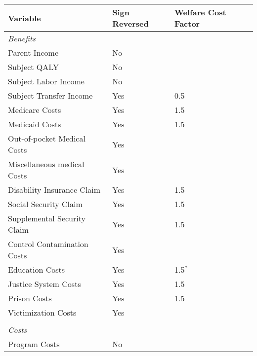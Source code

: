 \begin{tabular}{l l p{2cm}}
\hline\hline			
Variable & Sign Reversed	& Welfare Cost Factor \\
\hline
\emph{Benefits} 	\\			
Parent Income			& No \\
Subject QALY			& No \\
Subject Labor Income	& No \\
Subject Transfer Income	& Yes	& 0.5 \\
Medicare Costs			& Yes	& 1.5 \\
Medicaid Costs			& Yes	& 1.5 \\
Out-of-pocket Medical Costs	& Yes \\
Miscellaneous medical Costs	& Yes \\
Disability Insurance Claim	& Yes	&	1.5 \\
Social Security Claim	& Yes	&	1.5 \\
Supplemental Security Claim	& Yes	&	1.5 \\
Control Contamination Costs	& Yes	& \\
Education Costs			& Yes	& 1.5$^{*}$ \\
Justice System Costs	& Yes	& 1.5 \\
Prison Costs			& Yes	& 1.5 \\
Victimization Costs		& Yes	& \\
\\
\emph{Costs} 	\\			
Program Costs			& No \\
\hline\hline			
\end{tabular}